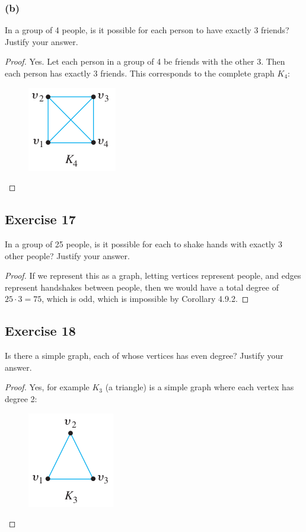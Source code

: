 \documentclass[14pt]{extarticle}
\begin{document}
\subsubsection{(b)}
In a group of 4 people, is it possible for each person to have exactly 3 friends? Justify your answer.

\begin{proof}
Yes. Let each person in a group of 4 be friends with the other 3. Then each person has exactly 3 friends. This corresponds to the complete graph $K_{4}$:
\begin{figure}[ht!]
\centering
\includegraphics[scale=0.5]{../images/4.9.16.b.png}
\end{figure}
\end{proof}

\subsection{Exercise 17}
In a group of 25 people, is it possible for each to shake hands with exactly 3 other people? Justify your answer.

\begin{proof}
If we represent this as a graph, letting vertices represent people, and edges represent handshakes between people, then we would have a total degree of $25 \cdot 3 = 75$, which is odd, which is impossible by Corollary 4.9.2.
\end{proof}

\subsection{Exercise 18}
Is there a simple graph, each of whose vertices has even degree? Justify your answer.

\begin{proof}
Yes, for example $K_3$ (a triangle) is a simple graph where each vertex has degree 2:
\begin{figure}[ht!]
\centering
\includegraphics[scale=0.5]{../images/4.9.18.png}
\end{figure}
\end{proof}
\end{document}
